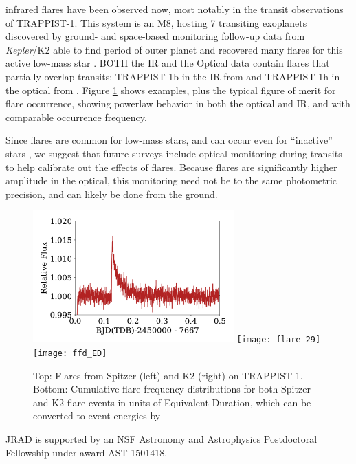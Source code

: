 \documentclass{rnaastex}
\newcommand{\Kepler}{\textsl{Kepler}\xspace}
\begin{document}
infrared flares have been observed now, most notably in the transit observations of TRAPPIST-1. This system is an M8, hosting 7 transiting exoplanets discovered by ground- and space-based monitoring \citep{gillon2016,gillon2017}
follow-up data from \Kepler/K2 able to find period of outer planet \citep{luger2017} and recovered many flares for this active low-mass star \citep{vida2017}. 
BOTH the IR and the Optical data contain flares that partially overlap transits: TRAPPIST-1b in the IR from \citet{gillon2017} and TRAPPIST-1h in the optical from \citet{luger2017}.
Figure \ref{fig:1} shows examples, plus the typical figure of merit for flare occurrence, showing powerlaw behavior in both the optical and IR, and with comparable occurrence frequency. 


Since flares are common for low-mass stars, and can occur even for ``inactive'' stars \citep[e.g.][]{hawley2014}, we suggest that future surveys include optical monitoring during transits to help calibrate out the effects of flares. Because flares are significantly higher amplitude in the optical, this monitoring need not be to the same photometric precision, and can likely be done from the ground.




\begin{figure}[h!]
\begin{center}
\includegraphics[height=2in]{trappist1_flare3}
\texttt{[image: flare\_29]}\\
\texttt{[image: ffd\_ED]}
\caption{Top: Flares from Spitzer (left) and K2 (right) on TRAPPIST-1. 
Bottom: Cumulative flare frequency distributions for both Spitzer and K2 flare events in units of Equivalent Duration, which can be converted to event energies by 
\label{fig:1}}
\end{center}
\end{figure}



\acknowledgments

JRAD is supported by an NSF Astronomy and Astrophysics Postdoctoral Fellowship under award AST-1501418. 



\end{document}
